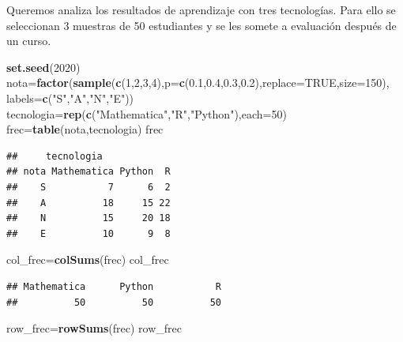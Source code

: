 \documentclass[
]{article}
\newenvironment{Shaded}{\begin{snugshade}}{\end{snugshade}}
\newcommand{\DataTypeTok}[1]{\textcolor[rgb]{0.13,0.29,0.53}{#1}}
\newcommand{\DecValTok}[1]{\textcolor[rgb]{0.00,0.00,0.81}{#1}}
\newcommand{\FloatTok}[1]{\textcolor[rgb]{0.00,0.00,0.81}{#1}}
\newcommand{\KeywordTok}[1]{\textcolor[rgb]{0.13,0.29,0.53}{\textbf{#1}}}
\newcommand{\NormalTok}[1]{#1}
\newcommand{\OtherTok}[1]{\textcolor[rgb]{0.56,0.35,0.01}{#1}}
\newcommand{\StringTok}[1]{\textcolor[rgb]{0.31,0.60,0.02}{#1}}
\begin{document}
Queremos analiza los resultados de aprendizaje con tres tecnologías.
Para ello se seleccionan 3 muestras de 50 estudiantes y se les somete a
evaluación después de un curso.

\begin{Shaded}
\begin{Highlighting}[]
\KeywordTok{set.seed}\NormalTok{(}\DecValTok{2020}\NormalTok{)}
\NormalTok{nota=}\KeywordTok{factor}\NormalTok{(}\KeywordTok{sample}\NormalTok{(}\KeywordTok{c}\NormalTok{(}\DecValTok{1}\NormalTok{,}\DecValTok{2}\NormalTok{,}\DecValTok{3}\NormalTok{,}\DecValTok{4}\NormalTok{),}\DataTypeTok{p=}\KeywordTok{c}\NormalTok{(}\FloatTok{0.1}\NormalTok{,}\FloatTok{0.4}\NormalTok{,}\FloatTok{0.3}\NormalTok{,}\FloatTok{0.2}\NormalTok{),}\DataTypeTok{replace=}\OtherTok{TRUE}\NormalTok{,}\DataTypeTok{size=}\DecValTok{150}\NormalTok{),}
            \DataTypeTok{labels=}\KeywordTok{c}\NormalTok{(}\StringTok{"S"}\NormalTok{,}\StringTok{"A"}\NormalTok{,}\StringTok{"N"}\NormalTok{,}\StringTok{"E"}\NormalTok{))}
\NormalTok{tecnologia=}\KeywordTok{rep}\NormalTok{(}\KeywordTok{c}\NormalTok{(}\StringTok{"Mathematica"}\NormalTok{,}\StringTok{"R"}\NormalTok{,}\StringTok{"Python"}\NormalTok{),}\DataTypeTok{each=}\DecValTok{50}\NormalTok{)}
\NormalTok{frec=}\KeywordTok{table}\NormalTok{(nota,tecnologia)}
\NormalTok{frec}
\end{Highlighting}
\end{Shaded}

\begin{verbatim}
##     tecnologia
## nota Mathematica Python  R
##    S           7      6  2
##    A          18     15 22
##    N          15     20 18
##    E          10      9  8
\end{verbatim}

\begin{Shaded}
\begin{Highlighting}[]
\NormalTok{col\_frec=}\KeywordTok{colSums}\NormalTok{(frec)}
\NormalTok{col\_frec}
\end{Highlighting}
\end{Shaded}

\begin{verbatim}
## Mathematica      Python           R 
##          50          50          50
\end{verbatim}

\begin{Shaded}
\begin{Highlighting}[]
\NormalTok{row\_frec=}\KeywordTok{rowSums}\NormalTok{(frec)}
\NormalTok{row\_frec}
\end{Highlighting}
\end{Shaded}
\end{document}

